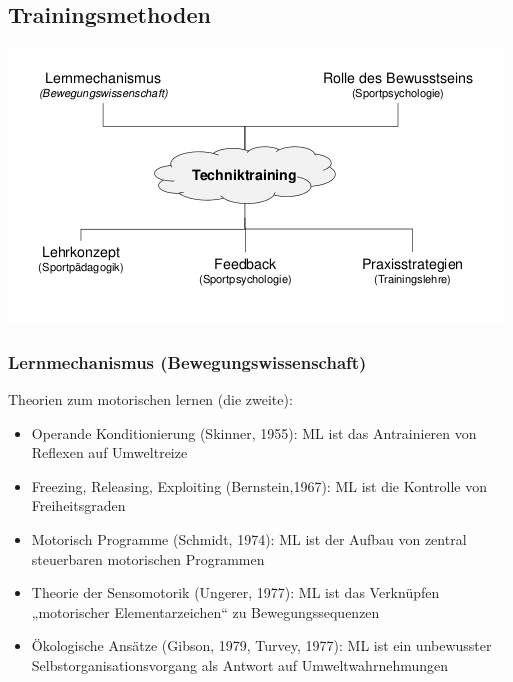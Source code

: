 \subsection{Trainingsmethoden}

\includegraphics[width=\textwidth]{pictures/tech_mindmap}

\subsubsection*{Lernmechanismus (Bewegungswissenschaft)}

Theorien zum motorischen lernen (die zweite):
\begin{itemize}
    \item Operande Konditionierung (Skinner, 1955): ML ist das Antrainieren von Reflexen auf Umweltreize
    \item Freezing, Releasing, Exploiting (Bernstein,1967): ML ist die Kontrolle von Freiheitsgraden
    \item Motorisch Programme (Schmidt, 1974): ML ist der Aufbau von zentral steuerbaren motorischen Programmen
    \item Theorie der Sensomotorik (Ungerer, 1977): ML ist das Verknüpfen „motorischer Elementarzeichen“ zu Bewegungssequenzen
    \item Ökologische Ansätze (Gibson, 1979, Turvey, 1977): ML ist ein unbewusster Selbstorganisationsvorgang als Antwort auf Umweltwahrnehmungen
\end{itemize}

